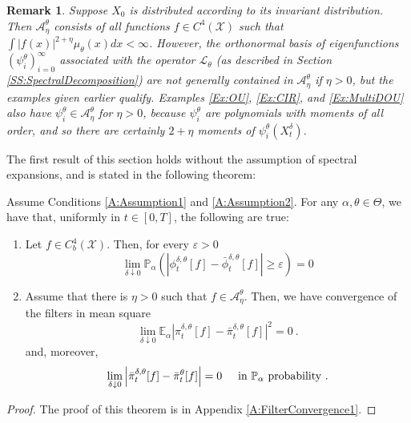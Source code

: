 \documentclass{article}
\newtheorem{remark}{ Remark}
\begin{document}
\begin{remark}
\label{R:eigenfunctionsInA}
Suppose $X_0$ is distributed according to its invariant distribution. Then $\mathcal A_\eta^\theta$ consists of all functions $f\in C^4(\mathcal X)$ such that $\int |f(x)|^{2+\eta}\mu_\theta(x)dx<\infty$. However, the orthonormal basis of eigenfunctions $(\psi_i^\theta)_{i=0}^\infty$ associated with the operator $\mathcal L_\theta$ (as described in Section \ref{SS:SpectralDecomposition}) are not generally contained in $\mathcal A_\eta^\theta$ if $\eta>0$, but the examples given earlier qualify. %
Examples \ref{Ex:OU}, \ref{Ex:CIR}, and \ref{Ex:MultiDOU} also have $\psi_i^\theta\in\mathcal A_\eta^\theta$ for $\eta>0$, because  $\psi_i^\theta$ are polynomials with moments of all order, and so there are certainly $2+\eta$ moments of $\psi_i^\theta(X_t^\delta)$.
\end{remark}

The first result of this section holds without the assumption of spectral expansions, and is stated in the following theorem:
\begin{theorem}\label{T:FilterConvergence1}
Assume Conditions \ref{A:Assumption1} and \ref{A:Assumption2}. For any $\alpha,\theta\in\Theta$, we have that, uniformly in $t\in[0,T]$, the following are true:
\begin{enumerate}
\item{Let $f\in C^{4}_{b}(\mathcal{X})$. Then,  for every $\varepsilon>0$
\[
\lim_{\delta\downarrow 0}\mathbb{P}_{\alpha}\left( \left|\phi_t^{\delta,\theta}[f]-\bar\phi_t^{\delta,\theta}[f]\right| \geq \varepsilon \right)=0
\]
}
\item{Assume that there is $\eta>0$ such that $f\in\mathcal{A}_{\eta}^{\theta}$. Then, we have convergence of the filters in mean square
\[\lim_{\delta\downarrow 0}\mathbb E_{\alpha}\left|\pi_t^{\delta,\theta}[f]-\bar \pi_t^{\delta, \theta}[f]\right|^2=0\ . \]
and, moreover,
\[\lim_{\delta\downarrow 0}\left|\bar \pi_t^{\delta,\theta}[f]-\bar \pi_t^{\theta}[f]\right|=0\hspace{.5cm}\hbox{in $\mathbb P_\alpha$ probability}\ .\]}
\end{enumerate}
\end{theorem}
\begin{proof} The proof of this theorem is in Appendix \ref{A:FilterConvergence1}. \end{proof}
\end{document}
